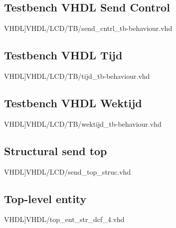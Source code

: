 \subsection{Testbench VHDL Send Control}
\scriptsize 
 VHDL]{VHDL/LCD/TB/send_cntrl_tb-behaviour.vhd}
\normalsize
\label{code:tb_send_cntrl}
\subsection{Testbench VHDL Tijd}
\scriptsize 
 VHDL]{VHDL/LCD/TB/tijd_tb-behaviour.vhd}
\normalsize
\label{code:tb_tijd}
\subsection{Testbench VHDL Wektijd}
\scriptsize 
 VHDL]{VHDL/LCD/TB/wektijd_tb-behaviour.vhd}
\normalsize
\label{code:tb_wektijd}

\subsection{Structural send top}
\scriptsize 
 VHDL]{VHDL/LCD/send_top_struc.vhd}
\normalsize
\label{code:tb_send_top}


\subsection{Top-level entity}
\scriptsize 
 VHDL]{VHDL/top_ent_str_dcf_4.vhd}
\label{code:top-level-entity}
\normalsize
